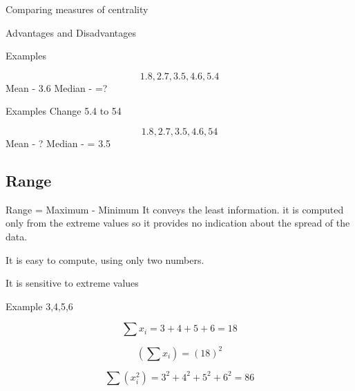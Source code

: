 Comparing measures of centrality

Advantages and Disadvantages

Examples

\[1.8,2.7,3.5,4.6,5.4\]
Mean - 3.6
Median - =?



Examples
Change 5.4 to 54

\[1.8,2.7,3.5,4.6,54\]
Mean - ?
Median - = 3.5







\subsection*{Range}

Range = Maximum - Minimum
It conveys the least information. it is computed only from the extreme values so it provides no indication about the spread of the data.

It is easy to compute, using only two numbers.

It is sensitive to extreme values


Example 3,4,5,6

\[\sum x_i = 3+4+5+6 = 18\]


\[(\sum x_i) = (18)^2\]


\[\sum (x_i^2) = 3^2+4^2+5^2+6^2 = 86\]
